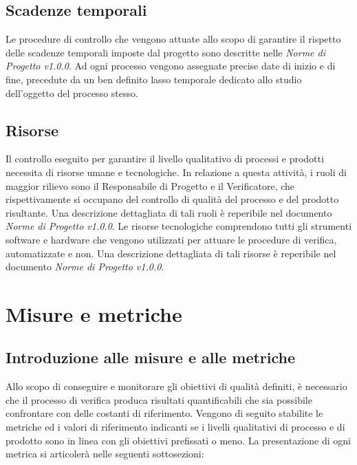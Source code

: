 \documentclass[openany,12pt,a4paper]{report}
\begin{document}
    \section{Scadenze temporali}
    
    Le procedure di controllo che vengono attuate allo scopo di garantire il rispetto delle scadenze temporali imposte dal progetto sono descritte nelle \textit{Norme di Progetto v1.0.0}. Ad ogni processo vengono assegnate precise date di inizio e di fine, precedute da un ben definito lasso temporale dedicato allo studio dell'oggetto del processo stesso.
    
    \section{Risorse}
    
    Il controllo eseguito per garantire il livello qualitativo di processi e prodotti necessita di risorse umane e tecnologiche. In relazione a questa attività, i ruoli di maggior rilievo sono il Responsabile di Progetto e il Verificatore, che rispettivamente si occupano del controllo di qualità del processo e del prodotto risultante. Una descrizione dettagliata di tali ruoli è reperibile nel documento \textit{Norme di Progetto v1.0.0}. 
    Le risorse tecnologiche comprendono tutti gli strumenti software e hardware che vengono utilizzati per attuare le procedure di verifica, automatizzate e non. Una descrizione dettagliata di tali risorse è reperibile nel documento \textit{Norme di Progetto v1.0.0}. 



\chapter{Misure e metriche}

\section{Introduzione alle misure e alle metriche}

Allo scopo di conseguire e monitorare gli obiettivi di qualità definiti, è necessario che il processo di verifica produca risultati quantificabili che sia possibile confrontare con delle costanti di riferimento. Vengono di seguito stabilite le metriche ed i valori di riferimento indicanti se i livelli qualitativi di processo e di prodotto sono in linea con gli obiettivi prefissati o meno. La presentazione di ogni metrica si articolerà nelle seguenti sottosezioni:
\end{document}
